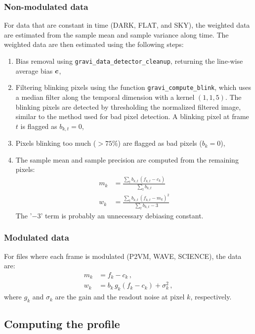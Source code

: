\documentclass[a4paper,11pt,twoside]{scrartcl}
\newcommand{\bias}{c}
\newcommand{\data}{m}
\begin{document}
\subsubsection{Non-modulated data}
For data that are constant in time (DARK, FLAT, and SKY), the weighted data are estimated from the sample mean and sample variance along time. The weighted data are then estimated using the following steps:
\begin{enumerate}
       \item Bias removal using \verb|gravi_data_detector_cleanup|, returning the line-wise average bias $\V{\bias}$,
       \item Filtering blinking pixels using the function  \verb+gravi_compute_blink+, which uses a median filter along the temporal dimension with a kernel $(1,1,5)$. The blinking pixels are detected by thresholding the normalized filtered image, similar to the method used for bad pixel detection. A blinking pixel at frame $t$ is flagged as $b_{k,t} = 0$,
       \item Pixels blinking too much ($> 75\%$) are flagged as bad pixels ($b_{k} = 0$),
       \item The sample mean and sample precision are computed from the remaining pixels:
       \begin{align}
            \data_k & = \frac{ \sum_t b_{k,t} \, (f_{k,t} - \bias_k)}{\sum_t b_{k,t}}\\
            w_k & =  \frac{ \sum_t b_{k,t} \, (f_{k,t} - \data_k)^2}{\sum_t b_{k,t} - 3}
       \end{align}
       The '$-3$' term is probably an unnecessary debiasing constant.
\end{enumerate}

\subsubsection{Modulated data}

For files where each frame is modulated (P2VM, WAVE, SCIENCE), the data are:
\begin{align}
    \data_k &= f_k - \bias_k\,, \\
    w_k &= b_k \, g_k(f_k - \bias_k) + \sigma_k^{2}\,,
\end{align}
where $g_k$ and $\sigma_k$ are the gain and the readout noise at pixel $k$, respectively.

\subsection{Computing the profile}
\end{document}
